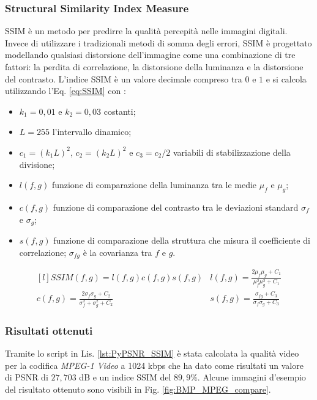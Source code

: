 \subsubsection{Structural Similarity Index Measure}
SSIM è un metodo per predirre la qualità percepità nelle immagini digitali. Invece di utilizzare i tradizionali metodi di somma degli errori, SSIM è progettato modellando qualsiasi distorsione dell'immagine come una combinazione di tre fattori: la perdita di correlazione, la distorsione della luminanza e la distorsione del contrasto. L'indice SSIM è un valore decimale compreso tra $0$ e $1$ e si calcola utilizzando l'Eq. \ref{eq:SSIM} con \parencite{relationship_PSNR_and_SSI}:

\begin{itemize}
	\item $k_1 = 0,01$ e $k_2 = 0,03$ costanti;
	\item $L = 255$ l'intervallo dinamico;
	\item $c_1 = (k_1 L)^2$, $c_2 = (k_2 L)^2$ e $c_3 = c_2/2$ variabili di stabilizzazione della divisione;
	\item $l(f,g)$ funzione di comparazione della luminanza tra le medie $\mu_f$ e $\mu_g$;
	\item $c(f,g)$ funzione di comparazione del contrasto tra le deviazioni standard $\sigma_f$ e $\sigma_g$;
	\item $s(f,g)$ funzione di comparazione della struttura che misura il coefficiente di correlazione; $\sigma_{fg}$ è la covarianza tra $f$ e $g$.
\end{itemize}

\begin{equation} \label{eq:SSIM}
	\begin{matrix*}[l]
		SSIM(f,g) =  l(f,g) c(f,g) s(f,g) & l(f,g)= \frac{2 \mu_f \mu_g  + C_1}{\mu_f^2 \mu_g^2  + C_1} \\
		c(f,g)= \frac{2 \sigma_f \sigma_g  + C_2}{\sigma_f^2 + \sigma_g^2  + C_2} & s(f,g)= \frac{\sigma_{fg}+C_3}{\sigma_f \sigma_g + C_3}
	\end{matrix*}
\end{equation}



\subsubsection{Risultati ottenuti}
Tramite lo script in Lis. \ref{lst:PyPSNR_SSIM} è stata calcolata la qualità video per la codifica \textit{MPEG-1 Video} a 1024 kbps che ha dato come risultati un valore di PSNR di $27,703$ \si{dB} e un indice SSIM del $89,9\%$. Alcune immagini d'esempio del risultato ottenuto sono visibili in Fig. \ref{fig:BMP_MPEG_compare}.

